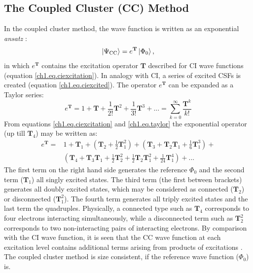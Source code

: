 \subsection{The Coupled Cluster (CC) Method}
In the coupled cluster method, the wave function is written as an exponential \textit{ansatz} \cite{cc1,cc2}:
\begin{equation}
\Ket{\Psi_{\mathrm{CC}}}  = e^{\mathbf{T}}\Ket{\Phi_{0}},
\end{equation}
in which $e^\mathbf{T}$ contains the excitation operator $\mathbf{T}$ described for CI wave functions (equation \ref{ch1.eq.ciexcitation}). In analogy with CI, a series of excited CSFs is created (equation \ref{ch1.eq.ciexcited}).  The operator $e^{\mathbf{T}}$ can be expanded as a Taylor series:
\begin{equation}
e^{\mathbf{T}} = 1 + \mathbf{T} + \frac{1}{2!}\mathbf{T}^2 + \frac{1}{3!}\mathbf{T}^3 + ... = \sum_{k=0}^{\infty} \frac{\mathbf{T}^k}{k!}
\label{ch1.eq.taylor}
\end{equation}
From equations \ref{ch1.eq.ciexcitation} and \ref{ch1.eq.taylor} the exponential operator (up till $\mathbf{T}_4$) may be written as:
\begin{equation}
\begin{split}
e^{\mathbf{T}} = & 1 + \mathbf{T}_1 + (\mathbf{T}_2 + \frac{1}{2}\mathbf{T}_1^2) + (\mathbf{T}_3 + \mathbf{T}_2\mathbf{T}_1 + \frac{1}{6}\mathbf{T}_1^3) + \\
& (\mathbf{T}_4 + \mathbf{T}_3\mathbf{T}_1 + \frac{1}{2}\mathbf{T}_2^2 + \frac{1}{2}\mathbf{T}_2\mathbf{T}_1^2 + \frac{1}{24} \mathbf{T}_1^4) + ...
\end{split}
\end{equation}
The first term on the right hand side generates the reference $\Phi_0$ and the second term ($\mathbf{T}_1$) all singly excited states. The third term (the first between brackets) generates all doubly excited states, which may be considered as connected ($\mathbf{T}_2$) or disconnected ($\mathbf{T}_1^2$). The fourth term  generates all triply excited states and the last term the quadruples. Physically, a connected type such as $\mathbf{T}_4$ corresponds to four electrons interacting simultaneously, while a disconnected term such as $\mathbf{T}_2^2$ corresponds to two non-interacting pairs of interacting electrons. By comparison with the CI wave function, it is seen that the CC wave function at each excitation level contains additional terms arising from products of excitations \cite{jensen}. The coupled cluster method is size consistent, if the reference wave function ($\Phi_0$) is.

